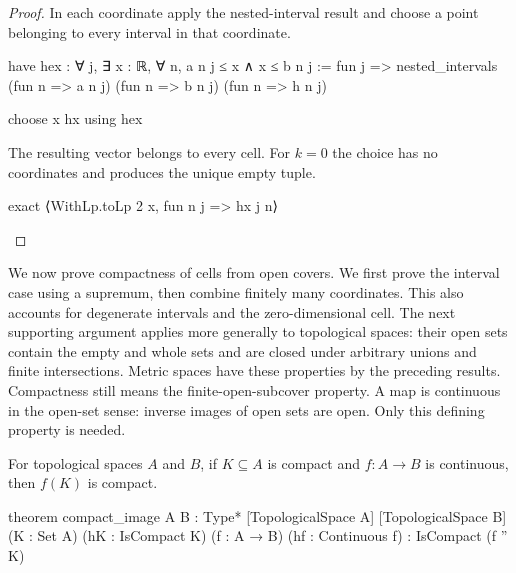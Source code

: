 \begin{proof}
  In each coordinate apply the nested-interval result and choose a point belonging to every
  interval in that coordinate.

  \begin{lean}
    have hex : ∀ j, ∃ x : ℝ, ∀ n, a n j ≤ x ∧ x ≤ b n j :=
      fun j => nested_intervals (fun n => a n j) (fun n => b n j) (fun n => h n j)

    choose x hx using hex
  \end{lean}

  The resulting vector belongs to every cell.
  For $k=0$ the choice has no coordinates and produces the unique empty tuple.

  \begin{lean}
    exact ⟨WithLp.toLp 2 x, fun n j => hx j n⟩
  \end{lean}
\end{proof}

We now prove compactness of cells from open covers.
We first prove the interval case using a supremum, then combine finitely many coordinates.
This also accounts for degenerate intervals and the zero-dimensional cell.
The next supporting argument applies more generally to topological spaces: their open sets contain
the empty and whole sets and are closed under arbitrary unions and finite intersections.
Metric spaces have these properties by the preceding results.
Compactness still means the finite-open-subcover property.
A map is continuous in the open-set sense: inverse images of open sets are open.
Only this defining property is needed.

\begin{lemma}
  \label{ma:lem:compact-image}
  For topological spaces $A$ and $B$, if $K\subseteq A$ is compact and $f:A\to B$ is continuous,
  then $f(K)$ is compact.

  \begin{lean}
    theorem compact_image {A B : Type*} [TopologicalSpace A] [TopologicalSpace B]
        (K : Set A) (hK : IsCompact K) (f : A → B) (hf : Continuous f) :
        IsCompact (f '' K)
  \end{lean}
\end{lemma}

